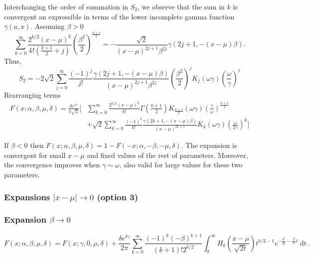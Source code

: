 \documentclass[10pt,a4paper,oneside]{article}
\numberwithin{equation}{section}
\begin{document}
Interchanging the order of summation in $S_2$, we observe that the sum in $k$ is convergent an expressible in terms of the lower incomplete gamma function $\gamma(a, x)$. Assuming $\beta > 0$
\begin{equation}
\sum_{k=0}^{\infty}\frac{2^{k/2}(x-\mu)^k}{k! (\frac{k+1}{2}+ j)} \left(\frac{\beta^2}{2}\right)^{\frac{k+1}{2}} = -\frac{\sqrt{2}}{(x-\mu)^{2j+1}\beta^{2j}} \gamma \left(2j + 1, -(x-\mu)\beta\right).
\end{equation}
Thus,
\begin{equation*}
S_2 = -2\sqrt{2} \sum_{j=0}^{\infty} \frac{(-1)^j}{j!}\frac{\gamma \left(2j + 1, -(x-\mu)\beta\right)}{(x-\mu)^{2j+1}\beta^{2j}} \left(\frac{\beta^2}{2}\right)^j  K_j(\omega \gamma) \left(\frac{\omega}{\gamma}\right)^j
\end{equation*}
Rearranging terms
\begin{align}
F(x;\alpha, \beta, \mu, \delta) = \frac{\delta e^{\delta \gamma}}{\pi \sqrt{2}} \bigg[& \sum_{k=0}^{\infty}\frac{2^{k/2}(x-\mu)^k}{k!} \Gamma\left(\frac{k+1}{2}\right) K_{\frac{k+1}{2}}(\omega \gamma) \left(\frac{\gamma}{\omega}\right)^{\frac{k+1}{2}}\nonumber\\
& + \sqrt{2}\sum_{k=0}^{\infty} \frac{(-1)^k}{k!}\frac{\gamma \left(2k + 1, -(x-\mu)\beta\right)}{(x-\mu)^{2k+ 1}}  K_k(\omega \gamma) \left(\frac{\omega}{2\gamma}\right)^k \bigg]
\end{align}

If $\beta < 0$ then $F(x;\alpha, \beta, \mu, \delta) = 1 - F(-x;\alpha, -\beta, -\mu, \delta)$. The expansion is convergent for small $x-\mu$ and fixed values of the rest of parameters. Moreover, the convergence improves when $\gamma \sim \omega$, also valid for large values for these two parameters.

\subsubsection{Expansions $|x-\mu| \to 0$ (option 3)}

\subsubsection{Expansion $\beta \to 0$}

\begin{equation}
F(x; \alpha, \beta, \mu, \delta) = F(x; \gamma, 0, \mu, \delta) + \frac{\delta e^{\delta \gamma}}{2\pi} \sum_{k=0}^{\infty} \frac{(-1)^k (-\beta)^{k+1}}{(k+1)! 2^{k/2}} \int_0^{\infty} H_k\left(\frac{x-\mu}{\sqrt{2t}}\right) t^{k/2 - 1} e^{-\frac{\delta^2}{2t} - \frac{\gamma^2}{2}t} \mathop{dt}.
\end{equation}
\end{document}

